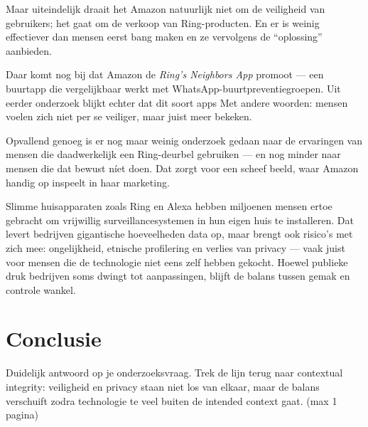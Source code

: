 \documentclass[nonacm,sigconf]{acmart}
\begin{document}
    Maar uiteindelijk draait het Amazon natuurlijk niet om de veiligheid van gebruikers; het gaat om de verkoop van Ring-producten.
    En er is weinig effectiever dan mensen eerst bang maken en ze vervolgens de “oplossing” aanbieden.

    Daar komt nog bij dat Amazon de \textit{Ring’s Neighbors App} promoot — een buurtapp die vergelijkbaar werkt met WhatsApp-buurtpreventiegroepen.
    Uit eerder onderzoek blijkt echter dat dit soort apps
    Met andere woorden: mensen voelen zich niet per se veiliger, maar juist meer bekeken.

    Opvallend genoeg is er nog maar weinig onderzoek gedaan naar de ervaringen van mensen die daadwerkelijk een Ring-deurbel gebruiken — en nog minder naar mensen die dat bewust níet doen.
    Dat zorgt voor een scheef beeld, waar Amazon handig op inspeelt in haar marketing.

    Slimme huisapparaten zoals Ring en Alexa hebben miljoenen mensen ertoe gebracht om vrijwillig surveillancesystemen in hun eigen huis te installeren.
    Dat levert bedrijven gigantische hoeveelheden data op, maar brengt ook risico’s met zich mee: ongelijkheid, etnische profilering en verlies van privacy — vaak juist voor mensen die de technologie niet eens zelf hebben gekocht. Hoewel publieke druk bedrijven soms dwingt tot aanpassingen, blijft de balans tussen gemak en controle wankel.


    \subsection{}
    \parencite{chaudhari2020smart}

    \subsection{}
    \parencite{tabassum2023exploring}

    \section{Conclusie}
    Duidelijk antwoord op je onderzoeksvraag.
    Trek de lijn terug naar contextual integrity: veiligheid en privacy staan niet los van elkaar, maar de balans verschuift zodra technologie te veel buiten de intended context gaat. (max 1 pagina)

    \printbibliography

    \balance %
\end{document}
